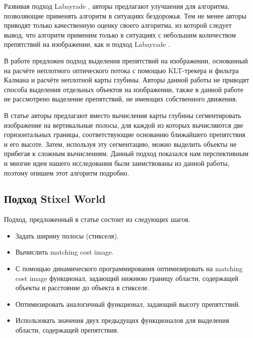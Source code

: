\documentclass[aps,%
14pt,%
final,%
oneside,
onecolumn,%
musixtex, %
superscriptaddress,%
centertags]{extarticle} %
\begin{document}
Развивая подход Labayrade \cite{labayrade2002real}, авторы \cite{broggi2006single} предлагают улучшения для алгоритма, позволяющие применять алгоритм в ситуациях бездорожья. Тем не менее авторы приводят только качественную оценку своего алгоритма, из которой следует вывод, что алгоритм применим только в ситуациях с небольшим количеством препятствий на изображении, как и подход Labayrade  \cite{labayrade2002real}.

В работе \cite{franke20056d} предложен подход выделения препятствий на изображении, основанный на расчёте неплотного оптического потока с помощью KLT-трекера и фильтра Калмана и расчёте неплотной карты глубины. Авторы данной работы не приводят способа выделения отдельных объектов на изображении, также в данной работе не рассмотрено выделение препятствий, не имеющих собственного движения.

В статье \cite{pfeiffer2010efficient} авторы предлагают вместо вычисления карты глубины сегментировать изображение на вертикальные полосы, для каждой из которых вычисляются две горизонтальных границы, соответствующие основанию ближайшего препятствия и его высоте. Затем, используя эту сегментацию, можно выделить объекты не прибегая к сложным вычислениям. Данный подход показался нам перспективным и многие идеи нашего исследования были заимствованы из данной работы, поэтому опишем этот алгоритм подробно.


\subsection{Подход Stixel World}

Подход, предложенный в статье \cite{pfeiffer2010efficient} состоит из следующих шагов.

\begin{itemize}
     \item Задать ширину полосы (стикселя).
     \item Вычислить matching cost image.
     \item С помощью динамического программирования оптимизировать на matching cost image функционал, задающий нижнюю границу области, содержащей объекты и расстояние до объекта в стикселе.
     \item Оптимизировать аналогичный функционал, задающий высоту препятствий.
     \item Использовать значения двух предыдущих функционалов для выделения области, содержащей препятствия.
\end{itemize}
\end{document}
